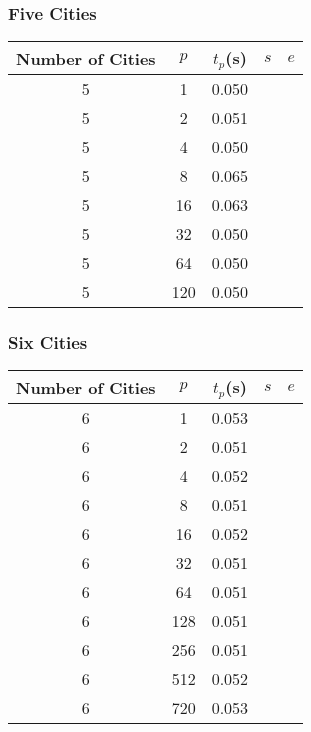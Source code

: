 \documentclass[12pt, letterpaper]{article}
\begin{document}
\subsubsection{Five Cities}
\begin{center}
  \begin{tabular}{|c | c c c c ||}
    \hline
    Number of Cities & $p$ & $t_p$(s) & $s$ & $e$ \\
    \hline\hline
      5 & 1 & 0.050 &  &  \\
      5 & 2 & 0.051 &  &  \\
      5 & 4 & 0.050 &  &  \\
      5 & 8 & 0.065 &  &  \\
      5 & 16 & 0.063 &  &  \\
      5 & 32 & 0.050 &  &  \\
      5 & 64 & 0.050 &  &  \\
      5 & 120 & 0.050 &  &  \\
      \hline\hline
      \hline
  \end{tabular}
\end{center}
\subsubsection{Six Cities}
\begin{center}
  \begin{tabular}{|c | c c c c ||}
    \hline
    Number of Cities & $p$ & $t_p$(s) & $s$ & $e$ \\
    \hline\hline
      6 & 1 &  0.053&  &  \\
      6 & 2 &  0.051&  &  \\
      6 & 4 &  0.052&  &  \\
      6 & 8 &  0.051&  &  \\
      6 & 16 & 0.052 &  &  \\
      6 & 32 & 0.051 &  &  \\
      6 & 64 & 0.051 &  &  \\
      6 & 128 &0.051  &  &  \\
      6 & 256 &0.051  &  &  \\
      6 & 512 &0.052  &  &  \\
      6 & 720 &0.053  &  &  \\
      \hline\hline
      \hline
  \end{tabular}
\end{center}
\end{document}
